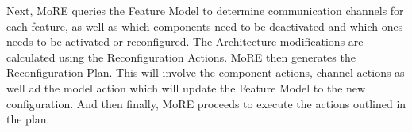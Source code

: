 \documentclass[conference]{IEEEtran}
\begin{document}
Next, MoRE queries the Feature Model to determine communication channels for each feature, as well as which components need to be deactivated and which ones needs to be activated or reconfigured. The Architecture modifications are calculated using the Reconfiguration Actions. MoRE then generates the Reconfiguration Plan. This will involve the component actions, channel actions as well ad the model action which will update the Feature Model to the new configuration. And then finally, MoRE proceeds to execute the actions outlined in the plan.

\begin{thebibliography}{00}

	\bibitem{}

\end{thebibliography}
\end{document}

